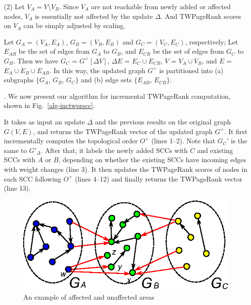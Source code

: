 \sstab(2) Let $V_A = V\setminus V_B$. Since $V_A$ are not reachable from newly added or affected nodes, $V_A$ is essentially not affected by the update $\Delta$. And TWPageRank scores on $V_A$ can be simply adjusted by scaling.

Let $G_A=(V_A,E_A)$, $G_B=(V_B,E_B)$ and $G_C=(V_C,E_C)$, respectively;
Let $E_{AB}$ be the set of edges from $G_A$ to $G_B$, and $E_{CB}$ be the set of edges from $G_C$ to $G_B$.
%
Then we have $G_C$ = $G^+[\Delta V]$, $\Delta E$ = $E_C\cup E_{CB}$, $V$ = $V_A\cup V_B$, and $E$ = $E_A\cup E_B\cup E_{AB}$.
%
In this way, the updated graph $G^+$ is partitioned into (a) subgraphs $\{G_A$, $G_B$, $G_C\}$ and (b) edge sets $\{E_{AB}$, $E_{CB}\}$.



. We now present our algorithm for incremental TWPageRank  computation, shown in Fig.~\ref{alg-inctwprscc}.


It takes as input an update $\Delta$ and the previous results on the original graph $G(V,E)$, and returns the TWPageRank vector of the updated graph $G^+$. It first incrementally computes the topological order $O^+$ 
(lines 1--2). Note that $G_C'$ is the same to $G'_\Delta$.
%
After that, it labels the newly added SCCs with $C$ and existing SCCs with $A$ or $B$, depending on whether the existing SCCs have incoming edges with weight changes (line 3).
%
It then updates the TWPageRank scores of nodes in each SCC following $O^+$ (lines 4--12) and finally returns the TWPageRank vector (line 13).
%
%


\begin{figure}[tb!]
\centering
\includegraphics[scale=0.6]{fig/General_framework_peak_ABC.eps}
\vspace{-2ex}
\caption{\small An example of affected and unaffected areas}
\label{fig-inc-division}
\vspace{-3ex}
\end{figure}


